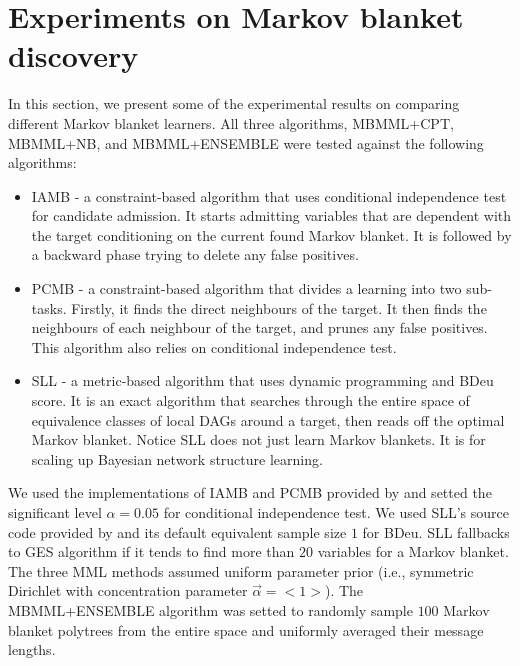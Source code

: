 \section{Experiments on Markov blanket discovery}
In this section, we present some of the experimental results on comparing different Markov blanket learners. All three algorithms, MBMML+CPT, MBMML+NB, and MBMML+ENSEMBLE were tested against the following algorithms: 
\begin{itemize}
\item IAMB - a constraint-based algorithm that uses conditional independence test for candidate admission. It starts admitting variables that are dependent with the target conditioning on the current found Markov blanket. It is followed by a backward phase trying to delete any false positives.  
\item PCMB - a constraint-based algorithm that divides a learning into two sub-tasks. Firstly, it finds the direct neighbours of the target. It then finds the neighbours of each neighbour of the target, and prunes any false positives. This algorithm also relies on conditional independence test. 
\item SLL - a metric-based algorithm that uses dynamic programming and BDeu score. It is an exact algorithm that searches through the entire space of equivalence classes of local DAGs around a target, then reads off the optimal Markov blanket. Notice SLL does not just learn Markov blankets. It is for scaling up Bayesian network structure learning. 
\end{itemize}
We used the implementations of IAMB and PCMB provided by \cite{pena2007towards} and setted the significant level $\alpha=0.05$ for conditional independence test. We used SLL's source code provided by \cite{niinimaki2012local} and its default equivalent sample size $1$ for BDeu. SLL fallbacks to GES algorithm \cite{chickering2002learning} if it tends to find more than $20$ variables for a Markov blanket. The three MML methods assumed uniform parameter prior (i.e., symmetric Dirichlet with concentration parameter $\vec{\alpha} = <1>$). The MBMML+ENSEMBLE algorithm was setted to randomly sample $100$ Markov blanket polytrees from the entire space and uniformly averaged their message lengths. 

